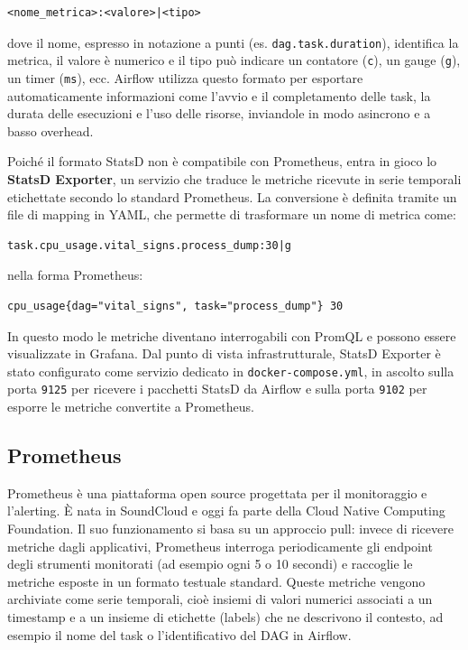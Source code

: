 \begin{verbatim}
<nome_metrica>:<valore>|<tipo>
\end{verbatim}

dove il nome, espresso in notazione a punti (es. \texttt{dag.task.duration}), identifica la metrica, il valore è numerico e il tipo può indicare un contatore (\texttt{c}), un gauge (\texttt{g}), un timer (\texttt{ms}), ecc. Airflow utilizza questo formato per esportare automaticamente informazioni come l’avvio e il completamento delle task, la durata delle esecuzioni e l’uso delle risorse, inviandole in modo asincrono e a basso overhead.

Poiché il formato StatsD non è compatibile con Prometheus, entra in gioco lo \textbf{StatsD Exporter}, un servizio che traduce le metriche ricevute in serie temporali etichettate secondo lo standard Prometheus. La conversione è definita tramite un file di mapping in YAML, che permette di trasformare un nome di metrica come:

\begin{verbatim}
task.cpu_usage.vital_signs.process_dump:30|g
\end{verbatim}

nella forma Prometheus:

\begin{verbatim}
cpu_usage{dag="vital_signs", task="process_dump"} 30
\end{verbatim}

In questo modo le metriche diventano interrogabili con PromQL e possono essere visualizzate in Grafana. Dal punto di vista infrastrutturale, StatsD Exporter è stato configurato come servizio dedicato in \texttt{docker-compose.yml}, in ascolto sulla porta \texttt{9125} per ricevere i pacchetti StatsD da Airflow e sulla porta \texttt{9102} per esporre le metriche convertite a Prometheus.

\subsection{Prometheus}
\label{sec:prometheus}
Prometheus è una piattaforma open source progettata per il monitoraggio e l’alerting. È nata in SoundCloud e oggi fa parte della Cloud Native Computing Foundation.
Il suo funzionamento si basa su un approccio pull: invece di ricevere metriche dagli applicativi, Prometheus interroga periodicamente gli endpoint degli strumenti monitorati (ad esempio ogni 5 o 10 secondi) e raccoglie le metriche esposte in un formato testuale standard.
Queste metriche vengono archiviate come serie temporali, cioè insiemi di valori numerici associati a un timestamp e a un insieme di etichette (labels) che ne descrivono il contesto, ad esempio il nome del task o l’identificativo del DAG in Airflow.

